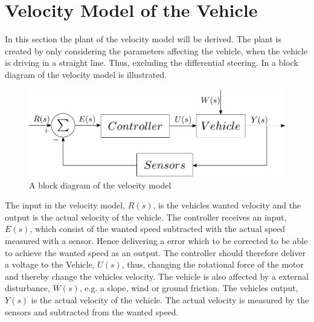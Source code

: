 \section{Velocity Model of the Vehicle}
In this section the plant of the velocity model will be derived. The plant is created by only considering the parameters affecting the vehicle, when the vehicle is driving in a straight line. Thus, excluding the differential steering. In  a block diagram of the velocity model is illustrated.   

\begin{figure}[H]
	\centering
	\includegraphics[scale=0.6]{figures/StartTotalModelsystem.pdf}
	\caption{A block diagram of the velocity model}
	\label{fig:StartTotalModelsystem}
\end{figure}

The input in the velocity model, $R(s)$, is the vehicles wanted velocity and the output is the actual velocity of the vehicle. The controller receives an input, $E(s)$, which consist of the wanted speed subtracted with the actual speed measured with a sensor. Hence delivering a error which to be corrected to be able to achieve the wanted speed as an output. The controller should therefore deliver a voltage to the Vehicle, $U(s)$, thus, changing the rotational force of the motor and thereby change the vehicles velocity. The vehicle is also affected by a external disturbance, $W(s)$, e.g. a slope, wind or ground friction. The vehicles output, $Y(s)$ is the actual velocity of the vehicle. The actual velocity is measured by the sensors and subtracted from the wanted speed.

